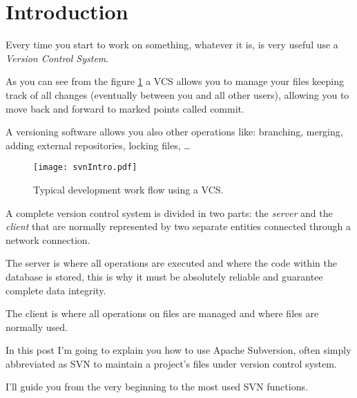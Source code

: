 

\section{Introduction}
\label{section:Intro}

Every time you start to work on something, whatever it is, is very useful use a \textit{Version Control System}.


As you can see from the figure \ref{fig:svnIntro} a VCS allows you to manage your files keeping track of all changes (eventually between you and all other users), allowing you to move back and forward to marked points called commit.

A versioning software allows you also other operations like: branching, merging, adding external repositories, locking files, \ldots\newline

\begin{figure}[htbp]
    \centering
    \texttt{[image: svnIntro.pdf]}
    \caption{Typical development work flow using a VCS.}
    \label{fig:svnIntro}
\end{figure}

A complete version control system is divided in two parts: the \textit{server} and the \textit{client} that are normally represented by two separate entities connected through a network connection. \newline

The server is where all operations are executed and where the code within the database is stored, this is why it must be absolutely reliable and guarantee complete data integrity.

The client is where all operations on files are managed and where files are normally used.\newline

In this post I'm going to explain you how to use Apache Subversion, often simply abbreviated as SVN to maintain a project's files under version control system.\newline


I'll guide you from the very beginning to the most used SVN functions.

